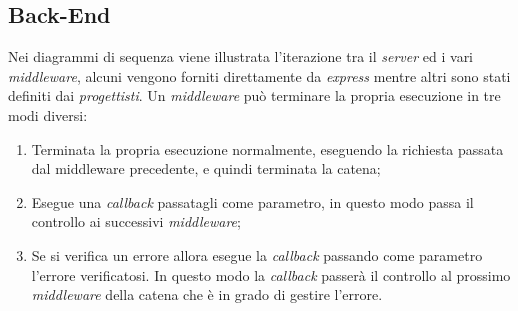 \subsection{Back-End}
Nei diagrammi di sequenza viene illustrata l'iterazione tra il \textit{server} ed i vari \textit{middleware}, alcuni vengono forniti direttamente da \textit{express} mentre altri sono stati definiti dai \textit{progettisti}. Un \textit{middleware} può terminare la propria esecuzione in tre modi diversi:
\begin{enumerate}
	\item Terminata la propria esecuzione normalmente, eseguendo la richiesta passata dal middleware precedente, e quindi terminata la catena;
	\item Esegue una \textit{callback} passatagli come parametro, in questo modo passa il controllo ai successivi \textit{middleware};
	\item Se si verifica un errore allora esegue la \textit{callback} passando come parametro l'errore verificatosi. In questo modo la \textit{callback} passerà il controllo al prossimo \textit{middleware} della catena che è in grado di gestire l'errore.
\end{enumerate}